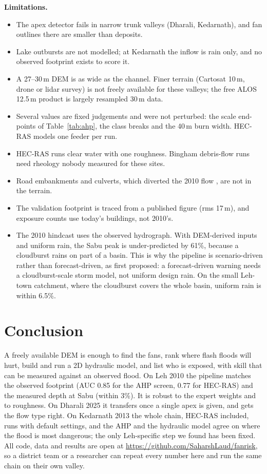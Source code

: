 \documentclass[sigconf,nonacm]{acmart}
\begin{document}
\textbf{Limitations.}
\begin{itemize}
  \item The apex detector fails in narrow trunk valleys (Dharali, Kedarnath), and fan outlines there are smaller than deposits.
  \item Lake outbursts are not modelled; at Kedarnath the inflow is rain only, and no observed footprint exists to score it.
  \item A 27--30\,m DEM is as wide as the channel. Finer terrain (Cartosat 10\,m, drone or lidar survey) is not freely available for these valleys; the free ALOS 12.5\,m product is largely resampled 30\,m data.
  \item Several values are fixed judgements and were not perturbed: the scale end-points of Table~\ref{tab:ahp}, the class breaks and the 40\,m burn width. HEC-RAS models one feeder per run.
  \item HEC-RAS runs clear water with one roughness. Bingham debris-flow runs need rheology nobody measured for these sites.
  \item Road embankments and culverts, which diverted the 2010 flow \cite{bhatt2011}, are not in the terrain.
  \item The validation footprint is traced from a published figure (rms 17\,m), and exposure counts use today's buildings, not 2010's.
  \item The 2010 hindcast uses the observed hydrograph. With DEM-derived inputs and uniform rain, the Sabu peak is under-predicted by 61\%, because a cloudburst rains on part of a basin. This is why the pipeline is scenario-driven rather than forecast-driven, as first proposed: a forecast-driven warning needs a cloudburst-scale storm model, not uniform design rain. On the small Leh-town catchment, where the cloudburst covers the whole basin, uniform rain is within 6.5\%.
\end{itemize}

\section{Conclusion}
A freely available DEM is enough to find the fans, rank where flash floods will hurt, build and run a 2D hydraulic model, and list who is exposed, with skill that can be measured against an observed flood. On Leh 2010 the pipeline matches the observed footprint (AUC 0.85 for the AHP screen, 0.77 for HEC-RAS) and the measured depth at Sabu (within 3\%). It is robust to the expert weights and to roughness. On Dharali 2025 it transfers once a single apex is given, and gets the flow type right. On Kedarnath 2013 the whole chain, HEC-RAS included, runs with default settings, and the AHP and the hydraulic model agree on where the flood is most dangerous; the only Leh-specific step we found has been fixed. All code, data and results are open at \url{https://github.com/SaharshLaud/fanrisk}, so a district team or a researcher can repeat every number here and run the same chain on their own valley.
\end{document}
